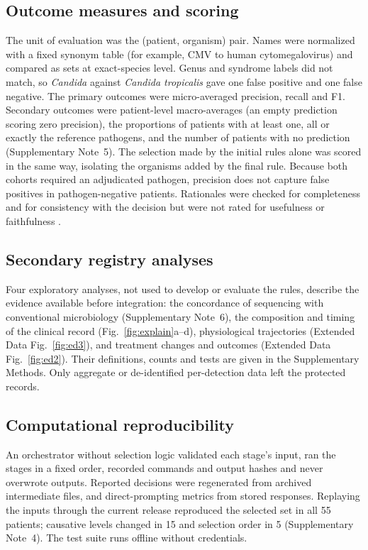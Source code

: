 \subsection*{Outcome measures and scoring}
The unit of evaluation was the (patient, organism) pair. Names were normalized with a fixed synonym table (for example, CMV to human cytomegalovirus) and compared as sets at exact-species level. Genus and syndrome labels did not match, so \textit{Candida} against \textit{Candida tropicalis} gave one false positive and one false negative. The primary outcomes were micro-averaged precision, recall and F1. Secondary outcomes were patient-level macro-averages (an empty prediction scoring zero precision), the proportions of patients with at least one, all or exactly the reference pathogens, and the number of patients with no prediction (Supplementary Note~5). The selection made by the initial rules alone was scored in the same way, isolating the organisms added by the final rule. Because both cohorts required an adjudicated pathogen, precision does not capture false positives in pathogen-negative patients. Rationales were checked for completeness and for consistency with the decision but were not rated for usefulness or faithfulness .

\subsection*{Secondary registry analyses}
Four exploratory analyses, not used to develop or evaluate the rules, describe the evidence available before integration: the concordance of sequencing with conventional microbiology (Supplementary Note~6), the composition and timing of the clinical record (Fig.~\ref{fig:explain}a--d), physiological trajectories (Extended Data Fig.~\ref{fig:ed3}), and treatment changes and outcomes (Extended Data Fig.~\ref{fig:ed2}). Their definitions, counts and tests are given in the Supplementary Methods. Only aggregate or de-identified per-detection data left the protected records.

\subsection*{Computational reproducibility}
An orchestrator without selection logic validated each stage's input, ran the stages in a fixed order, recorded commands and output hashes and never overwrote outputs. Reported decisions were regenerated from archived intermediate files, and direct-prompting metrics from stored responses. Replaying the inputs through the current release reproduced the selected set in all 55 patients; causative levels changed in 15 and selection order in 5 (Supplementary Note~4).  The test suite runs offline without credentials.


